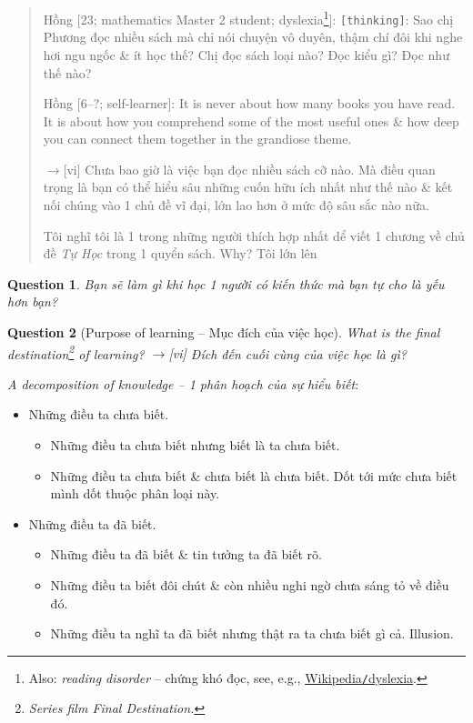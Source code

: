 \documentclass[12pt,twoside]{book}
\newtheorem{question}{Question}
\begin{document}
\begin{quote}
	{\sf Hồng [23; mathematics Master 2 student; dyslexia\footnote{Also: {\it reading disorder} -- chứng khó đọc, see, e.g., \href{https://en.wikipedia.org/wiki/Dyslexia}{Wikipedia{\tt/}dyslexia}.}]}: {\tt[thinking]}: Sao chị {\sf Phương} đọc nhiều sách mà chỉ nói chuyện vô duyên, thậm chí đôi khi nghe hơi ngu ngốc \& ít học thế? Chị đọc sách loại nào? Đọc kiểu gì? Đọc như thế nào?

	{\sf Hồng [6--?; self-learner]}: It is never about how many books you have read. It is about how you comprehend some of the most useful ones \& how deep you can connect them together in the grandiose theme.
	
	{\sf[en]$\to$[vi]} Chưa bao giờ là việc bạn đọc nhiều sách cỡ nào. Mà điều quan trọng là bạn có thể hiểu sâu những cuốn hữu ích nhất như thế nào \& kết nối chúng vào 1 chủ đề vĩ đại, lớn lao hơn ở mức độ sâu sắc nào nữa.
	
	Tôi nghĩ tôi là 1 trong những người thích hợp nhất dể viết 1 chương về chủ đề {\it Tự Học} trong 1 quyển sách. Why? Tôi lớn lên
\end{quote}

\begin{question}
	Bạn sẽ làm gì khi học 1 người có kiến thức mà bạn tự cho là yếu hơn bạn?
\end{question}

\begin{question}[Purpose of learning -- Mục đích của việc học]
	What is the final destination\footnote{Series film Final Destination.} of learning? {\sf[en]$\to$[vi]} Đích đến cuối cùng của việc học là gì?
\end{question}

{\it A decomposition of knowledge -- 1 phân hoạch của sự hiểu biết}:
\begin{itemize}
	\item Những điều ta chưa biết.
	\begin{itemize}
		\item Những điều ta chưa biết nhưng biết là ta chưa biết.
		\item Những điều ta chưa biết \& chưa biết là chưa biết. Dốt tới mức chưa biết mình dốt thuộc phân loại này.
	\end{itemize}
	\item Những điều ta đã biết.
	\begin{itemize}
		\item Những điều ta đã biết \& tin tưởng ta đã biết rõ.
		\item Những điều ta biết đôi chút \& còn nhiều nghi ngờ chưa sáng tỏ về điều đó.
		\item Những điều ta nghĩ ta đã biết nhưng thật ra ta chưa biết gì cả. Illusion.
	\end{itemize}
\end{itemize}
\end{document}
